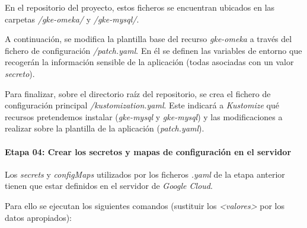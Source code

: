 En el repositorio del proyecto, estos ficheros se encuentran ubicados en
las carpetas \emph{/gke-omeka/} y \emph{/gke-mysql/}.

A continuación, se modifica la plantilla base del recurso
\emph{gke-omeka} a través del fichero de configuración
\emph{/patch.yaml}. En él se definen las variables de entorno que recogerán 
la información sensible de la aplicación (todas asociadas con un valor \emph{secreto}).

Para finalizar, sobre el directorio raíz del repositorio, se crea el
fichero de configuración principal \emph{/kustomization.yaml}. Este
indicará a \emph{Kustomize} qué recursos pretendemos instalar
(\emph{gke-mysql} y \emph{gke-mysql}) y las modificaciones a realizar
sobre la plantilla de la aplicación (\emph{patch.yaml}).


\paragraph{Etapa 04: Crear los secretos y mapas de configuración en el servidor}

Los \emph{secrets} y \emph{configMaps} utilizados por los ficheros \emph{.yaml} de la etapa
anterior tienen que estar definidos en el servidor de \emph{Google Cloud}.

Para ello se ejecutan los siguientes comandos (sustituir los \emph{<valores>} por los datos apropiados):

